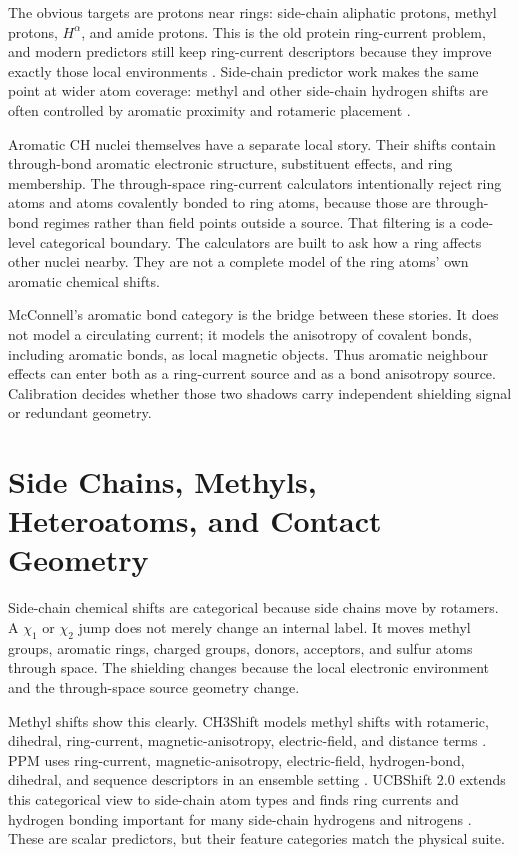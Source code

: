 \documentclass[11pt]{article}
\begin{document}
The obvious targets are protons near rings: side-chain aliphatic protons,
methyl protons, \(H^\alpha\), and amide protons. This is the old protein
ring-current problem, and modern predictors still keep ring-current descriptors
because they improve exactly those local environments
\cite{neal2003,shenbax2007,christensen2011,ptaszek2024}. Side-chain predictor
work makes the same point at wider atom coverage: methyl and other side-chain
hydrogen shifts are often controlled by aromatic proximity and rotameric
placement \cite{sahakyan2011,li2012,ptaszek2024}.

Aromatic CH nuclei themselves have a separate local story. Their shifts contain
through-bond aromatic electronic structure, substituent effects, and ring
membership. The through-space ring-current calculators intentionally reject
ring atoms and atoms covalently bonded to ring atoms, because those are
through-bond regimes rather than field points outside a source. That filtering
is a code-level categorical boundary. The calculators are built to ask how a
ring affects other nuclei nearby. They are not a complete model of the ring
atoms' own aromatic chemical shifts.

McConnell's aromatic bond category is the bridge between these stories. It
does not model a circulating current; it models the anisotropy of covalent
bonds, including aromatic bonds, as local magnetic objects. Thus aromatic
neighbour effects can enter both as a ring-current source and as a bond
anisotropy source. Calibration decides whether those two shadows carry
independent shielding signal or redundant geometry.

\section{Side Chains, Methyls, Heteroatoms, and Contact Geometry}

Side-chain chemical shifts are categorical because side chains move by rotamers.
A \(\chi_1\) or \(\chi_2\) jump does not merely change an internal label. It
moves methyl groups, aromatic rings, charged groups, donors, acceptors, and
sulfur atoms through space. The shielding changes because the local electronic
environment and the through-space source geometry change.

Methyl shifts show this clearly. CH3Shift models methyl shifts with rotameric,
dihedral, ring-current, magnetic-anisotropy, electric-field, and distance terms
\cite{sahakyan2011}. PPM uses ring-current, magnetic-anisotropy,
electric-field, hydrogen-bond, dihedral, and sequence descriptors in an
ensemble setting \cite{li2012}. UCBShift 2.0 extends this categorical view to
side-chain atom types and finds ring currents and hydrogen bonding important
for many side-chain hydrogens and nitrogens \cite{ptaszek2024}. These are
scalar predictors, but their feature categories match the physical suite.
\end{document}
